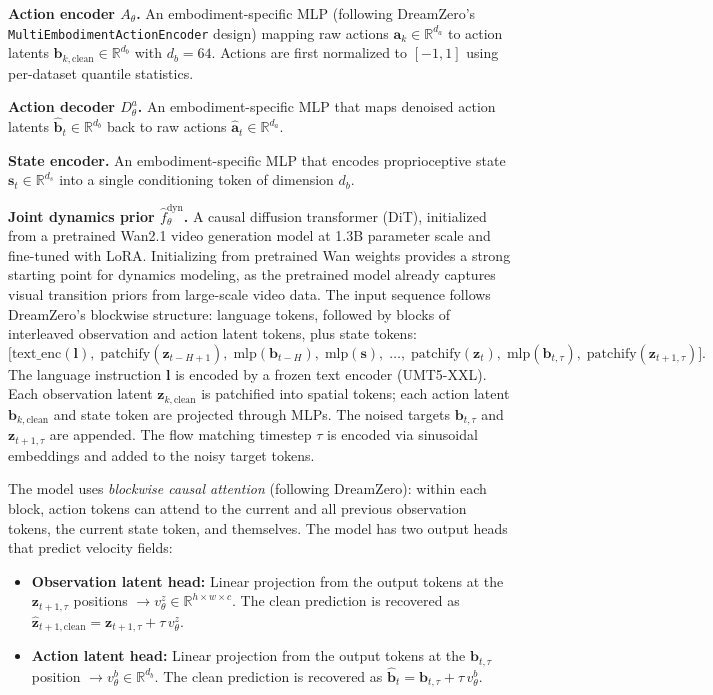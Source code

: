 \documentclass{article}
\newcommand{\vz}{\bm{z}}
\newcommand{\va}{\bm{a}}
\newcommand{\vb}{\bm{b}}
\newcommand{\R}{\mathbb{R}}
\begin{document}
\textbf{Action encoder $A_\theta$.}
An embodiment-specific MLP (following DreamZero's \texttt{MultiEmbodimentActionEncoder} design) mapping raw actions $\va_k \in \R^{d_a}$ to action latents $\vb_{k,\text{clean}} \in \R^{d_b}$ with $d_b = 64$.
Actions are first normalized to $[-1, 1]$ using per-dataset quantile statistics.

\textbf{Action decoder $D_\theta^a$.}
An embodiment-specific MLP that maps denoised action latents $\hat{\vb}_t \in \R^{d_b}$ back to raw actions $\hat{\va}_t \in \R^{d_a}$.

\textbf{State encoder.}
An embodiment-specific MLP that encodes proprioceptive state $\bm{s}_t \in \R^{d_s}$ into a single conditioning token of dimension $d_b$.

\textbf{Joint dynamics prior $\hat{f}_\theta^{\text{dyn}}$.}
A causal diffusion transformer (DiT), initialized from a pretrained Wan2.1 video generation model at 1.3B parameter scale and fine-tuned with LoRA.
Initializing from pretrained Wan weights provides a strong starting point for dynamics modeling, as the pretrained model already captures visual transition priors from large-scale video data.
The input sequence follows DreamZero's blockwise structure: language tokens, followed by blocks of interleaved observation and action latent tokens, plus state tokens:
\begin{equation}
  \big[\text{text\_enc}(\bm{l}),\; \text{patchify}(\vz_{t-H+1}),\; \text{mlp}(\vb_{t-H}),\; \text{mlp}(\bm{s}),\; \ldots,\; \text{patchify}(\vz_{t}),\; \text{mlp}(\vb_{t,\tau}),\; \text{patchify}(\vz_{t+1,\tau})\big].
  \label{eq:prior_input}
\end{equation}
The language instruction $\bm{l}$ is encoded by a frozen text encoder (UMT5-XXL). Each observation latent $\vz_{k,\text{clean}}$ is patchified into spatial tokens; each action latent $\vb_{k,\text{clean}}$ and state token are projected through MLPs. The noised targets $\vb_{t,\tau}$ and $\vz_{t+1,\tau}$ are appended. The flow matching timestep $\tau$ is encoded via sinusoidal embeddings and added to the noisy target tokens.

The model uses \emph{blockwise causal attention} (following DreamZero): within each block, action tokens can attend to the current and all previous observation tokens, the current state token, and themselves. The model has two output heads that predict velocity fields:
\begin{itemize}[leftmargin=*,itemsep=2pt]
  \item \textbf{Observation latent head:} Linear projection from the output tokens at the $\vz_{t+1,\tau}$ positions $\to v_\theta^z \in \R^{h \times w \times c}$. The clean prediction is recovered as $\hat{\vz}_{t+1,\text{clean}} = \vz_{t+1,\tau} + \tau\, v_\theta^z$.
  \item \textbf{Action latent head:} Linear projection from the output tokens at the $\vb_{t,\tau}$ position $\to v_\theta^b \in \R^{d_b}$. The clean prediction is recovered as $\hat{\vb}_t = \vb_{t,\tau} + \tau\, v_\theta^b$.
\end{itemize}
\end{document}
